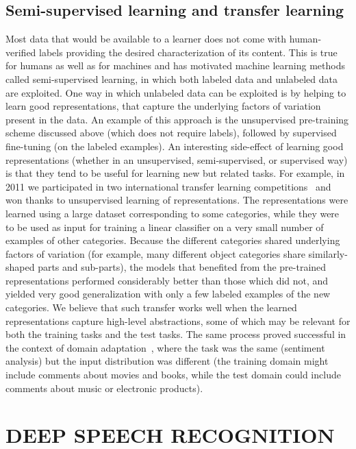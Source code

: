 \documentclass[11pt]{article} %
\begin{document}
\subsection{Semi-supervised learning and transfer learning}


Most data that would be available to a learner does not come with
human-verified labels providing the desired characterization of its
content. This is true for humans as well as for machines and has motivated
machine learning methods called semi-supervised learning, in which both
labeled data and unlabeled data are exploited. One way in which unlabeled
data can be exploited is by helping to learn good representations, that
capture the underlying factors of variation present in the data. An example
of this approach is the unsupervised pre-training scheme discussed above
(which does not require labels), followed by supervised fine-tuning (on the
labeled examples). An interesting side-effect of learning good
representations (whether in an unsupervised, semi-supervised, or supervised
way) is that they tend to be useful for learning new but related tasks. For
example, in 2011 we participated in two international transfer learning
competitions~\citep{UTLC+LISA-2011-small,Goodfellow+all-NIPS2011} and won thanks to unsupervised learning of
representations. The representations were learned using a large dataset
corresponding to some categories, while they were to be used as input for
training a linear classifier on a very small number of examples of other
categories. Because the different categories shared underlying factors of
variation (for example, many different object categories share
similarly-shaped parts and sub-parts), the models that benefited from the
pre-trained representations performed considerably better than those which
did not, and yielded very good generalization with only a few labeled
examples of the new categories. We believe that such transfer works well
when the learned representations capture high-level abstractions, some of
which may be relevant for both the training tasks and the test tasks. The
same process proved successful in the context of domain adaptation~\citep{Glorot+al-ICML-2011-small},
where the task was the same (sentiment analysis) but the input
distribution was different (the training domain might include comments
about movies and books, while the test domain could include comments about
music or electronic products).


\section{DEEP SPEECH RECOGNITION}
\end{document}
